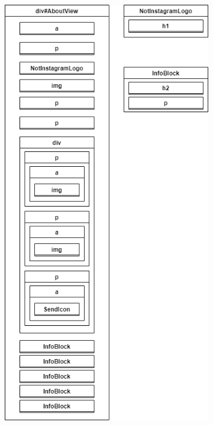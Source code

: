 \documentclass[a4paper, 10pt]{article}
\begin{document}
\begin{figure}
  \begin{center}
    \begin{subfigure}{0.49\linewidth}
      \begin{center}
        \includegraphics[width=\linewidth, keepaspectratio]{diagrams/about-dom.png}

\end{center}
\end{subfigure}
\end{center}
\end{figure}
\end{document}
